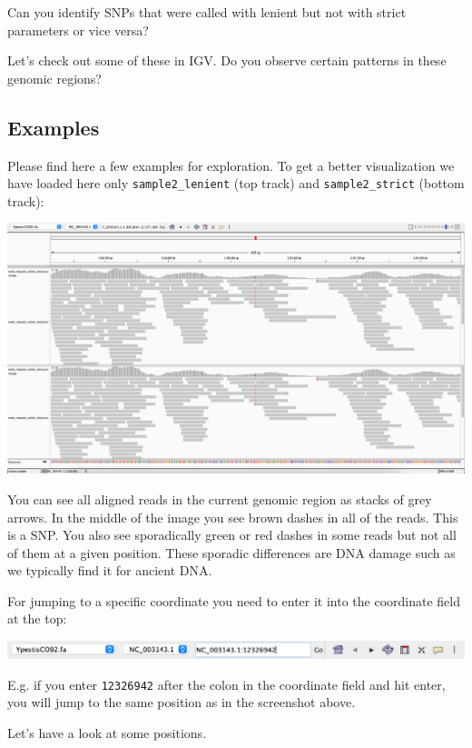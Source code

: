 \documentclass[
  letterpaper,
]{book}
\begin{document}
Can you identify SNPs that were called with lenient but not with strict
parameters or vice versa?

Let's check out some of these in IGV. Do you observe certain patterns in
these genomic regions?

\hypertarget{examples}{%
\subsection{Examples}\label{examples}}

Please find here a few examples for exploration. To get a better
visualization we have loaded here only \texttt{sample2\_lenient} (top
track) and \texttt{sample2\_strict} (bottom track):

\includegraphics{assets/images/chapters/genome-mapping/IGV_example_intro.png}

You can see all aligned reads in the current genomic region as stacks of
grey arrows. In the middle of the image you see brown dashes in all of
the reads. This is a SNP. You also see sporadically green or red dashes
in some reads but not all of them at a given position. These sporadic
differences are DNA damage such as we typically find it for ancient DNA.

For jumping to a specific coordinate you need to enter it into the
coordinate field at the top:

\includegraphics{assets/images/chapters/genome-mapping/IGV_coordinate_example.png}

E.g. if you enter \texttt{12326942} after the colon in the coordinate
field and hit enter, you will jump to the same position as in the
screenshot above.

Let's have a look at some positions.
\end{document}
